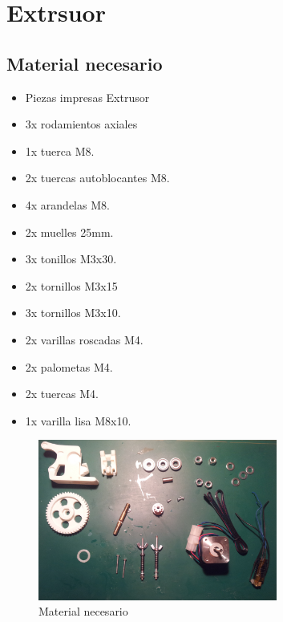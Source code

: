 	\section{Extrsuor}
	\subsection{Material necesario}
		\begin{itemize}
			\item Piezas impresas Extrusor
			\item 3x rodamientos axiales
			\item 1x tuerca M8.
			\item 2x tuercas autoblocantes M8.
			\item 4x arandelas M8.
			\item 2x muelles 25mm.
			\item 3x tonillos M3x30.
			\item 2x tornillos M3x15
			\item 3x tornillos M3x10.
			\item 2x varillas roscadas M4.
			\item 2x palometas M4.
			\item 2x tuercas M4.
			\item 1x varilla lisa M8x10.
		\end{itemize}
		\begin{figure}[!htp]
			\centering
			\includegraphics[width=0.7\textwidth]{../../Fotos/95.jpg}
			\caption{Material necesario}
		\end{figure}
		\newpage{}
